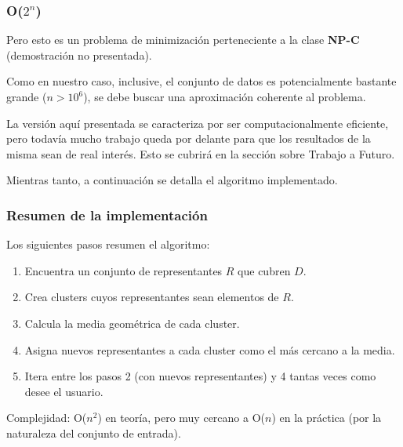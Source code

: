 \documentclass[xcolor=pdftex,dvipsnames,table,10pt,babel,spanish]{beamer}
\begin{document}
\begin{frame}
\frametitle{O($2^n$)}

\begin{alertblock}{}
Pero esto es un problema de minimizaci\'on perteneciente a la clase \textbf{NP-C} (demostraci\'on no presentada).
\end{alertblock}

\pause

Como en nuestro caso, inclusive, el conjunto de datos es potencialmente bastante grande ($n > 10^6$), se debe buscar una aproximaci\'on coherente al problema.

\pause

\begin{block}{}
La versi\'on aqu\'i presentada se caracteriza por ser computacionalmente eficiente, pero todav\'ia mucho trabajo queda por delante para que los resultados de la misma sean de real inter\'es. Esto se cubrir\'a en la secci\'on sobre Trabajo a Futuro.
\end{block}

\pause

Mientras tanto, a continuaci\'on se detalla el algoritmo implementado.

\end{frame}

\begin{frame}[fragile]

\frametitle{Resumen de la implementaci\'on}

Los siguientes pasos resumen el algoritmo:
\begin{exampleblock}{}
 
\begin{enumerate}
\item Encuentra un conjunto de representantes $R$ que cubren $D$.
\pause
\item Crea clusters cuyos representantes sean elementos de $R$.
\pause
\item Calcula la media geom\'etrica de cada cluster.
\pause
\item Asigna nuevos representantes a cada cluster como el m\'as cercano a la media.
\pause
\item Itera entre los pasos 2 (con nuevos representantes) y 4 tantas veces como desee el usuario.
\end{enumerate}

\end{exampleblock}

\pause

Complejidad: O($n^2$) en teor\'ia, pero muy cercano a O($n$) en la pr\'actica (por la naturaleza del conjunto de entrada).

\end{frame}
\end{document}
